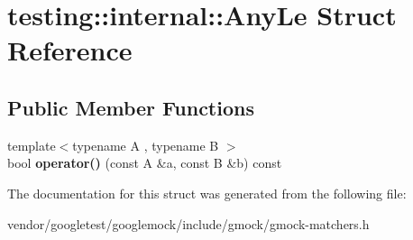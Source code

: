 \hypertarget{structtesting_1_1internal_1_1AnyLe}{}\section{testing\+:\+:internal\+:\+:Any\+Le Struct Reference}
\label{structtesting_1_1internal_1_1AnyLe}
\subsection*{Public Member Functions}
\begin{DoxyCompactItemize}
\item 
{\footnotesize template$<$typename A , typename B $>$ }\\bool {\bfseries operator()} (const A \&a, const B \&b) const \hypertarget{structtesting_1_1internal_1_1AnyLe_a9062e84179ff986d92913cab697d5a66}{}\label{structtesting_1_1internal_1_1AnyLe_a9062e84179ff986d92913cab697d5a66}

\end{DoxyCompactItemize}


The documentation for this struct was generated from the following file\+:\begin{DoxyCompactItemize}
\item 
vendor/googletest/googlemock/include/gmock/gmock-\/matchers.\+h\end{DoxyCompactItemize}
